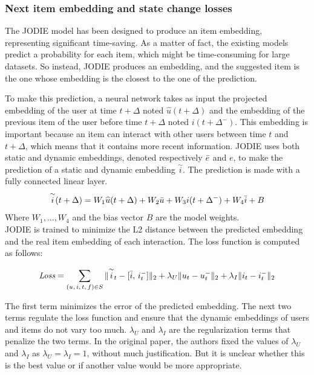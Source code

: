 \subsubsection{Next item embedding and state change losses}

The JODIE model has been designed to produce an item embedding, representing significant time-saving. As a matter of fact, the existing models predict a probability for each item, which might be time-consuming for large datasets. So instead, JODIE produces an embedding, and the suggested item is the one whose embedding is the closest to the one of the prediction.

To make this prediction, a neural network takes as input the projected embedding of the user at time $t+\Delta$ noted $\widehat u(t+\Delta)$ and the embedding of the previous item of the user before time $t+\Delta$ noted $i(t+\Delta^-)$. This embedding is important because an item can interact with other users between time $t$ and $t+\Delta$, which means that it contains more recent information. JODIE uses both static and dynamic embeddings, denoted respectively $\Bar{e}$ and $e$, to make the prediction of a static and dynamic embedding $\overset{\sim}{i}$. The prediction is made with a fully connected linear layer.
$$
\overset{\sim}{i} (t+\Delta) = W_1 \widehat u(t+\Delta) + W_2 \Bar{u} + W_3 i(t+\Delta^-) + W_4 \Bar{i} + B
$$
Where $W_1, ..., W_4$ and the bias vector $B$ are the model weights.\\

JODIE is trained to minimize the L2 distance between the predicted embedding and the real item embedding of each interaction. The loss function is computed as follows:

\begin{equation}
    \textit{Loss} = \sum_{(u,\,i,\,t,\,f) \in S} \| \overset{\sim}{i}_t - [\Bar{i},\,i_t^-] \|_2 + \lambda_U \|u_t - u_t^-\|_2 + \lambda_I \|i_t - i_t^-\|_2
\end{equation}

The first term minimizes the error of the predicted embedding. The next two terms regulate the loss function and ensure that  
the dynamic embeddings of users and items do not vary too much. $\lambda_U$ and $\lambda_I$ are the regularization terms that penalize the two terms. In the original paper, the authors fixed the values of $\lambda_U$ and $\lambda_I$ as $\lambda_U = \lambda_I = 1$, without much justification. But it is unclear whether this is the best value or if another value would be more appropriate. 

